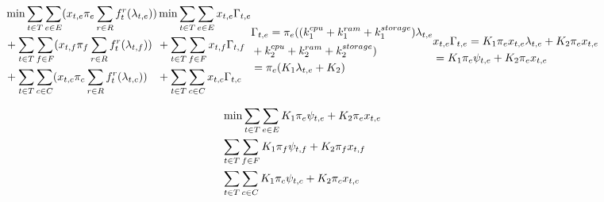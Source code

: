 \documentclass[conference]{IEEEtran}
\begin{document}
    \begin{subequations}
      \begin{align}
        & \notag \min \sum_{t \in T}\sum_{e \in E} (x_{t,e}\pi_e\sum_{r \in R}f_t^r(\lambda_{t,e})) \\
        &\notag + \sum_{t \in T}\sum_{f \in F} (x_{t,f}\pi_f\sum_{r \in R}f_t^r(\lambda_{t,f})) \\
        & + \sum_{t \in T}\sum_{c \in C} (x_{t,c}\pi_c\sum_{r \in R}f_t^r(\lambda_{t,c}))
      \end{align}
      \begin{align}
        & \notag \min \sum_{t \in T}\sum_{e \in E} x_{t,e}\Gamma_{t,e} \\
        & \notag + \sum_{t \in T}\sum_{f \in F} x_{t,f}\Gamma_{t,f} \\
        & + \sum_{t \in T}\sum_{c \in C} x_{t,c}\Gamma_{t,c}
      \end{align}
      \begin{align}
        &\notag \Gamma_{t,e} = \pi_e((k_1^{cpu}+k_1^{ram}+k_1^{storage})\lambda_{t,e} \\
        &\notag +k_2^{cpu}+k_2^{ram}+k_2^{storage}) \\
        & = \pi_e(K_1\lambda_{t,e}+K_2)
      \end{align}
      \begin{align}
        &\notag x_{t,e}\Gamma_{t,e} = K_1\pi_ex_{t,e}\lambda_{t,e} + K_2\pi_ex_{t,e} \\
        &= K_1\pi_e\psi_{t,e} + K_2\pi_ex_{t,e}
      \end{align}
    \end{subequations}

    \begin{subequations}
      \begin{align}
        & \notag \min \sum_{t \in T}\sum_{e \in E} K_1\pi_e\psi_{t,e}+K_2\pi_ex_{t,e} \\
        & \notag \sum_{t \in T}\sum_{f \in F} K_1\pi_f\psi_{t,f}+K_2\pi_fx_{t,f} \\
        & \sum_{t \in T}\sum_{c \in C} K_1\pi_c\psi_{t,c}+K_2\pi_cx_{t,c}
      \end{align}
    \end{subequations}
\end{document}
